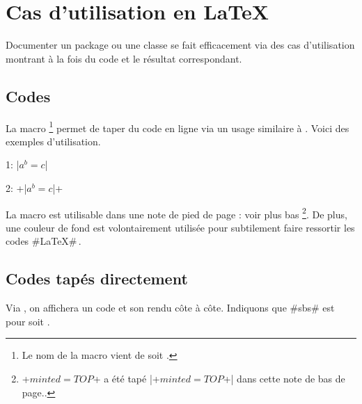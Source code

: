 \section{Cas d'utilisation en \LaTeX}

Documenter un package ou une classe se fait efficacement via des cas d'utilisation montrant à la fois du code et le résultat correspondant.




\subsection{Codes } \label{tdoc-listing-inline}

La macro 
\footnote{
    Le nom de la macro  vient de  soit .
}
permet de taper du code en ligne via un usage similaire à .
Voici des exemples d'utilisation.


\begin{tdoclatex}[sbs]
    1: \tdocinlatex|$a^b = c$|

    2: \tdocinlatex+\tdocinlatex|$a^b = c$|+
\end{tdoclatex}


\begin{tdocnote}
    La macro  est utilisable dans une note de pied de page : voir plus bas
    \footnote{
        \tdocinlatex+$minted = TOP$+ a été tapé \tdocinlatex|\tdocinlatex+$minted = TOP$+| dans cette note de bas de page..
    }.
    De plus, une couleur de fond est volontairement utilisée pour subtilement faire ressortir les codes \tdocinlatex#\LaTeX#\,.
\end{tdocnote}



\subsection{Codes tapés directement}

\begin{tdocexa}
    Via , on affichera un code et son rendu côte à côte.
    Indiquons que \tdocinlatex#sbs# est pour  soit .

\end{tdocexa}


